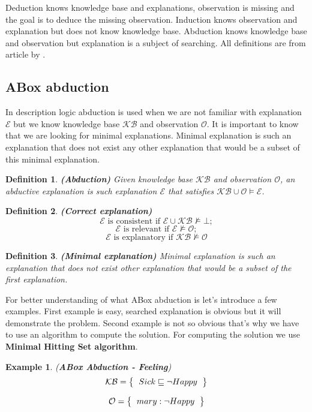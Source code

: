 \documentclass[12pt,a4paper]{article}
\newtheorem{definition}{Definition}[subsection]
\newtheorem{example}{Example}[subsection]
\begin{document}
Deduction knows knowledge base and explanations, observation is missing and the goal is to deduce the missing observation. Induction knows observation and explanation but does not know knowledge base. Abduction knows knowledge base and observation but explanation is a subject of searching. All definitions are from article by \citep{pukancovaAboxAbduction}.

\subsection{ABox abduction}
In description logic abduction is used when we are not familiar with explanation $\mathcal{E}$ but we know knowledge base $\mathcal{KB}$ and observation $\mathcal{O}$. It is important to know that we are looking for minimal explanations. Minimal explanation is such an explanation that does not exist any other explanation that would be a subset of this minimal explanation.

\begin{definition}{\textbf{(Abduction)}} 
	Given knowledge base $\mathcal{KB}$ and observation $\mathcal{O}$, an abductive explanation is such explanation $\mathcal{E}$ that satisfies $\mathcal{KB} \cup \mathcal{O} \models \mathcal{E}$.
\end{definition}

\begin{definition}{\textbf{(Correct explanation)}}
	\[ \mathcal{E} \text{ is consistent if } \mathcal{E} \cup \mathcal{KB} \not \models \mathcal{\bot}; \] 
	\[ \mathcal{E} \text{ is relevant if } \mathcal{E} \not \models \mathcal{O}; \]
	\[ \mathcal{E} \text{ is explanatory if } \mathcal{KB} \not \models \mathcal{O} \]
\end{definition}

\begin{definition}{\textbf{(Minimal explanation)}}
	Minimal explanation is such an explanation that does not exist other explanation that would be a subset of the first explanation.
\end{definition}

For better understanding of what ABox abduction is let's introduce a few examples. First example is easy, searched explanation is obvious but it will demonstrate the problem. Second example is not so obvious that's why we have to use an algorithm to compute the solution. For computing the solution we use \textbf{Minimal Hitting Set algorithm}.

\begin{example}{(\textbf{ABox Abduction - Feeling})}
	\[ 
	\mathcal{KB} = \left\{
	\begin{tabular}{l c}
	$Sick \sqsubseteq \neg Happy$
	\end{tabular}
	\right \}
	\]
	
	\[ 
	\mathcal{O} = \left\{
	\begin{tabular}{l c}
	$mary : \neg Happy$
	\end{tabular}
	\right \}
	\]								
\end{example}
\end{document}
